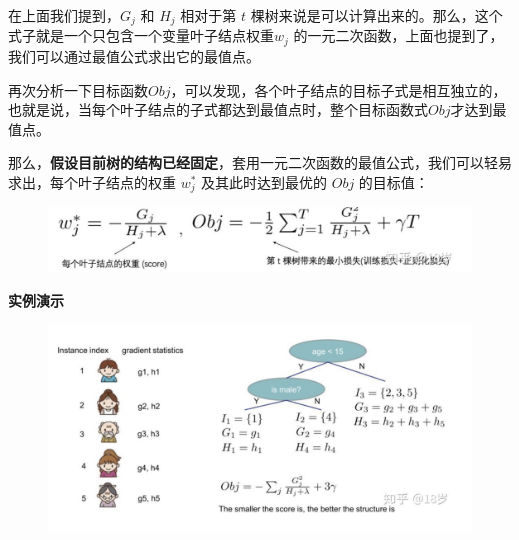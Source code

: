 \documentclass[12pt]{article}
\begin{document}
在上面我们提到，$G_j$ 和 $H_j$ 相对于第 $t$ 棵树来说是可以计算出来的。那么，这个式子就是一个只包含一个变量叶子结点权重$w_j$ 的一元二次函数，上面也提到了，我们可以通过最值公式求出它的最值点。

再次分析一下目标函数$Obj$，可以发现，各个叶子结点的目标子式是相互独立的，也就是说，当每个叶子结点的子式都达到最值点时，整个目标函数式$Obj$才达到最值点。

那么，\textbf{假设目前树的结构已经固定}，套用一元二次函数的最值公式，我们可以轻易求出，每个叶子结点的权重 $w^*_j$ 及其此时达到最优的 $Obj$ 的目标值：
\begin{figure}[H]
    \centering
    \includegraphics[width=.8\textwidth]{fig/XGBoost_Tree_Eq_Node_Grouping_Obj_Final_Opt.png}
\end{figure}

\begin{framed}
\textbf{实例演示}
\begin{figure}[H]
    \centering
    \includegraphics[width=1\textwidth]{fig/XGBoost_Tree_Train_Example.png}
\end{figure}
\end{framed}
\end{document}
